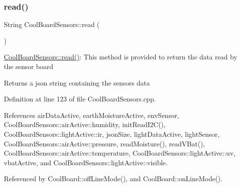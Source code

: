 \subsubsection{\texorpdfstring{read()}{read()}}
{\footnotesize\ttfamily String Cool\+Board\+Sensors\+::read (\begin{DoxyParamCaption}{ }\end{DoxyParamCaption})}

\hyperlink{classCoolBoardSensors_a91badb2539d91fda8679f2a597874c48}{Cool\+Board\+Sensors\+::read()}\+: This method is provided to return the data read by the sensor board

\begin{DoxyReturn}{Returns}
a json string containing the sensors data 
\end{DoxyReturn}


Definition at line 123 of file Cool\+Board\+Sensors.\+cpp.



References air\+Data\+Active, earth\+Moisture\+Active, env\+Sensor, Cool\+Board\+Sensors\+::air\+Active\+::humidity, init\+Read\+I2\+C(), Cool\+Board\+Sensors\+::light\+Active\+::ir, json\+Size, light\+Data\+Active, light\+Sensor, Cool\+Board\+Sensors\+::air\+Active\+::pressure, read\+Moisture(), read\+V\+Bat(), Cool\+Board\+Sensors\+::air\+Active\+::temperature, Cool\+Board\+Sensors\+::light\+Active\+::uv, vbat\+Active, and Cool\+Board\+Sensors\+::light\+Active\+::visible.



Referenced by Cool\+Board\+::off\+Line\+Mode(), and Cool\+Board\+::on\+Line\+Mode().


